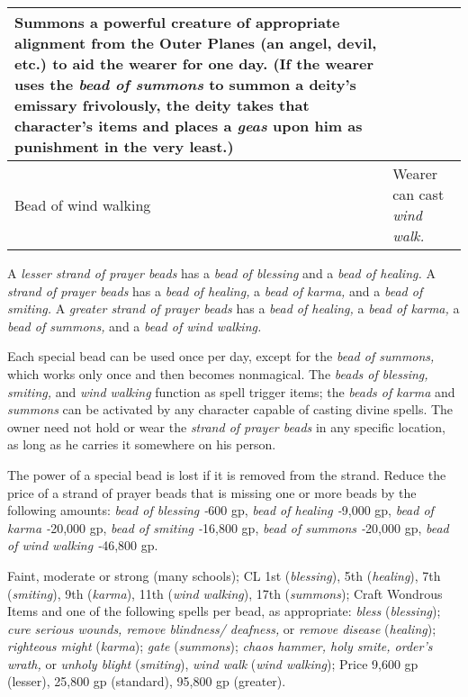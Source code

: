 \begin{longtable}{llll}
{\begin{minipage}[t]{0.043in}
Summons a powerful creature of appropriate alignment from the Outer Planes (an 
angel, devil, etc.) to aid the wearer for one day. (If the wearer uses the \textit{bead 
of summons }to summon a deity's emissary frivolously, the deity takes that character's 
items and places a \textit{geas }upon him as punishment in the very least.)\end{minipage}}\\
\hline
\multicolumn{1}{|p{0.891in}|}{\begin{minipage}[t]{0.891in}\raggedright
Bead of wind walking\end{minipage}} & \multicolumn{3}{p{3.609in}|}{\begin{minipage}[t]{3.609in}\raggedright
Wearer can cast \textit{wind walk.}\end{minipage}}\\
\hline
\end{longtable}

A \textit{lesser strand of prayer beads }has a \textit{bead of blessing }and a 
\textit{bead of healing. }A \textit{strand of prayer beads }has a \textit{bead 
of healing, }a \textit{bead of karma, }and a \textit{bead of smiting. }A \textit{greater 
strand of prayer beads }has a \textit{bead of healing, }a \textit{bead of karma, 
}a \textit{bead of summons, }and a \textit{bead of wind walking.}

Each special bead can be used once per day, except for the \textit{bead of summons, 
}which works only once and then becomes nonmagical. The \textit{beads of blessing, 
smiting, }and \textit{wind walking }function as spell trigger items; the \textit{beads 
of karma }and \textit{summons }can be activated by any character capable of casting 
divine spells. The owner need not hold or wear the \textit{strand of prayer beads 
}in any specific location, as long as he carries it somewhere on his person.

The power of a special bead is lost if it is removed from the strand. Reduce the 
price of a strand of prayer beads that is missing one or more beads by the following 
amounts: \textit{bead of blessing -}600 gp, \textit{bead of healing -}9,000 gp, 
\textit{bead of karma -}20,000 gp, \textit{bead of smiting -}16,800 gp, \textit{bead 
of summons -}20,000 gp, \textit{bead of wind walking -}46,800 gp.

Faint, moderate or strong (many schools); CL 1st (\textit{blessing}), 5th (\textit{healing}), 
7th (\textit{smiting}), 9th (\textit{karma}), 11th (\textit{wind walking}), 17th 
(\textit{summons}); Craft Wondrous Items and one of the following spells per bead, 
as appropriate: \textit{bless }(\textit{blessing}); \textit{cure serious wounds, 
remove blindness/ deafness, }or \textit{remove disease }(\textit{healing}); \textit{righteous 
might }(\textit{karma}); \textit{gate }(\textit{summons}); \textit{chaos hammer, 
holy smite, order's wrath, }or \textit{unholy blight }(\textit{smiting}), \textit{wind 
walk }(\textit{wind walking}); Price 9,600 gp (lesser), 25,800 gp (standard), 95,800 
gp (greater).

